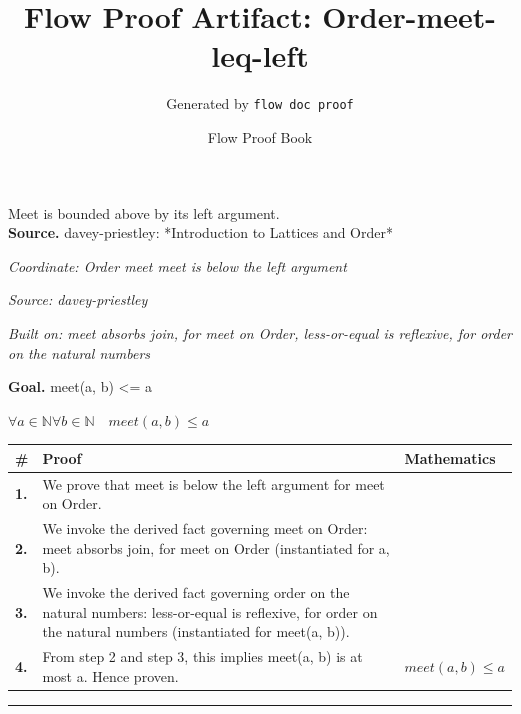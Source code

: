 \documentclass[11pt]{article}
\title{Flow Proof Artifact: Order-meet-leq-left}
\author{Generated by \texttt{flow doc proof}}
\date{Flow Proof Book}
\theoremstyle{definition}
\begin{document}
\maketitle
Meet is bounded above by its left argument.\\[0.5em]
\textbf{Source.} davey-priestley: *Introduction to Lattices and Order*\\[0.5em]
\bigskip
{}\par
\smallskip\noindent\textit{Coordinate: Order \cdot meet \cdot meet is below the left argument}\par
\smallskip\noindent\textit{Source: davey-priestley}\par
\smallskip\noindent\textit{Built on: meet absorbs join, for meet on Order, less-or-equal is reflexive, for order on the natural numbers}\par
\medskip
\noindent\textbf{Goal.} meet(a, b) <= a\par
\noindent$\displaystyle \forall a \in \mathbb{N} \forall b \in \mathbb{N}\quad meet(a, b) \le a$\par
\medskip
\noindent
\begin{tabular}{@{} >{\raggedright\arraybackslash}p{} >{\raggedright\arraybackslash}p{} >{\raggedleft\arraybackslash}p{} @{}}
\textbf{\#} & \textbf{Proof} & \textbf{Mathematics} \\
\midrule
\textbf{1.} & We prove that meet is below the left argument for meet on Order. & \\[0.45em]
\textbf{2.} & We invoke the derived fact governing meet on Order: meet absorbs join, for meet on Order (instantiated for a, b). & \\[0.45em]
\textbf{3.} & We invoke the derived fact governing order on the natural numbers: less-or-equal is reflexive, for order on the natural numbers (instantiated for meet(a, b)). & \\[0.45em]
\textbf{4.} & From step 2 and step 3, this implies meet(a, b) is at most a. Hence proven. & $\displaystyle meet(a, b) \le a$ \\[0.45em]
\bottomrule
\end{tabular}
\label{thm:Order-meet-meet_is_below_the_left_argument}
\par\medskip\hrule
\end{document}
